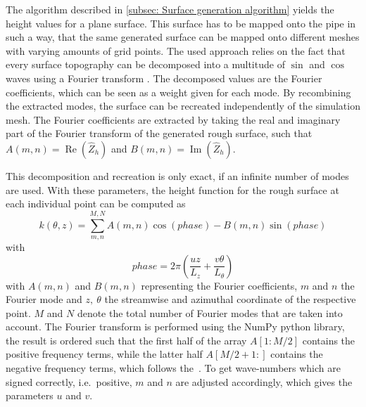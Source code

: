 The algorithm described in \autoref{subsec: Surface generation algorithm} yields the height values for a plane surface.
This surface has to be mapped onto the pipe in such a way, that the same generated surface can be mapped onto different meshes with varying amounts of grid points.
The used approach relies on the fact that every surface topography can be decomposed into a multitude of $\sin$ and $\cos$ waves using a Fourier transform \citep{perez-rafolsGeneratingRandomlyRough2019}.
The decomposed values are the Fourier coefficients, which can be seen as a weight given for each mode.
By recombining the extracted modes, the surface can be recreated independently of the simulation mesh.
The Fourier coefficients are extracted by taking the real and imaginary part  of the Fourier transform of the generated rough surface, such that $A(m,n) = \operatorname{Re}\left(\hat{Z}_h\right)$ and $B(m,n) = \operatorname{Im}\left(\hat{Z}_h\right)$.

This decomposition and recreation is only exact, if an infinite number of modes are used.
With these parameters, the height function for the rough surface at each individual point can be computed as
\begin{equation}\label{eq: height function}
    k(\theta,z) = \sum_{m,n}^{M,N} A(m,n)\cos(phase)- B(m,n)\sin(phase)
\end{equation}
with
\begin{equation}\label{eq: phase equation}
    phase = 2\pi\left(\frac{uz}{L_z} + \frac{v\theta}{L_{\theta}}\right)
\end{equation}
with $A(m,n)$ and $B(m,n)$ representing the Fourier coefficients, $m$ and $n$ the Fourier mode and $z,\ \theta$ the streamwise and azimuthal coordinate of the respective point.
$M$ and $N$ denote the total number of Fourier modes that are taken into account.
The Fourier transform is performed using the NumPy python library, the result is ordered such that the first half of the array $A[1:M/2]$ contains the positive frequency terms, while the latter half $A[M/2+1:]$ contains the negative frequency terms, which follows the~\cite{NumpyFT}.
To get wave-numbers which are signed correctly, i.e.\ positive, $m$ and $n$ are adjusted accordingly, which gives the parameters $u$ and $v$.

